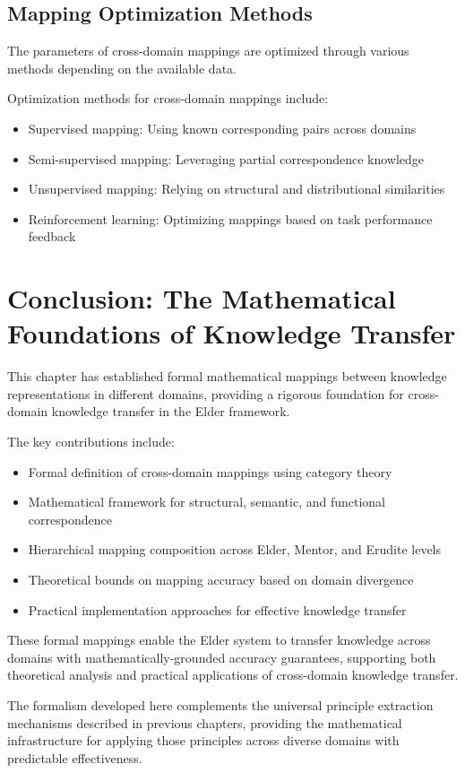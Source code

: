 \subsection{Mapping Optimization Methods}

The parameters of cross-domain mappings are optimized through various methods depending on the available data.

\begin{definition}
Optimization methods for cross-domain mappings include:
\begin{itemize}
    \item Supervised mapping: Using known corresponding pairs across domains
    \item Semi-supervised mapping: Leveraging partial correspondence knowledge
    \item Unsupervised mapping: Relying on structural and distributional similarities
    \item Reinforcement learning: Optimizing mappings based on task performance feedback
\end{itemize}
\end{definition}

\section{Conclusion: The Mathematical Foundations of Knowledge Transfer}

This chapter has established formal mathematical mappings between knowledge representations in different domains, providing a rigorous foundation for cross-domain knowledge transfer in the Elder framework.

The key contributions include:
\begin{itemize}
    \item Formal definition of cross-domain mappings using category theory
    \item Mathematical framework for structural, semantic, and functional correspondence
    \item Hierarchical mapping composition across Elder, Mentor, and Erudite levels
    \item Theoretical bounds on mapping accuracy based on domain divergence
    \item Practical implementation approaches for effective knowledge transfer
\end{itemize}

These formal mappings enable the Elder system to transfer knowledge across domains with mathematically-grounded accuracy guarantees, supporting both theoretical analysis and practical applications of cross-domain knowledge transfer.

The formalism developed here complements the universal principle extraction mechanisms described in previous chapters, providing the mathematical infrastructure for applying those principles across diverse domains with predictable effectiveness.